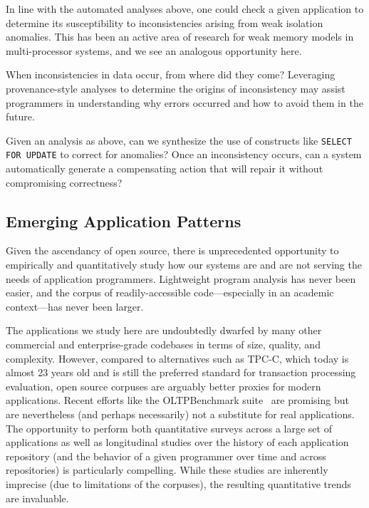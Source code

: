  In line with the automated
\iconfluence analyses above, one could check a given application to
determine its susceptibility to inconsistencies arising from weak
isolation anomalies. This has been an active area of research for weak
memory models in multi-processor systems, and we see an analogous
opportunity here.

 When inconsistencies in data
occur, from where did they come? Leveraging provenance-style analyses
to determine the origins of inconsistency may assist programmers in
understanding why errors occurred and how to avoid them in the future.

 Given an analysis as above, can
we synthesize the use of constructs like \texttt{SELECT FOR UPDATE} to
correct for anomalies? Once an inconsistency occurs, can a system
automatically generate a compensating action that will repair it
without compromising correctness?

\subsection{Emerging Application Patterns}

Given the ascendancy of open source, there is
unprecedented opportunity to empirically and quantitatively study how
our systems are and are not serving the needs of application
programmers. Lightweight program analysis has never been easier, and
the corpus of readily-accessible code---especially in an academic
context---has never been larger.

The applications we study here are undoubtedly dwarfed by many other
commercial and enterprise-grade codebases in terms of size, quality,
and complexity. However, compared to alternatives such as TPC-C, which
today is almost 23 years old and is still the preferred standard for
transaction processing evaluation, open source corpuses are arguably better
proxies for modern applications. Recent efforts like the OLTPBenchmark
suite~\cite{oltpbench} are promising but are nevertheless (and perhaps
necessarily) not a substitute for real applications. The opportunity
to perform both quantitative surveys across a large set of
applications as well as longitudinal studies over the history of each
application repository (and the behavior of a given programmer over
time and across repositories) is particularly compelling. While these
studies are inherently imprecise (due to limitations of the corpuses),
the resulting quantitative trends are invaluable.

